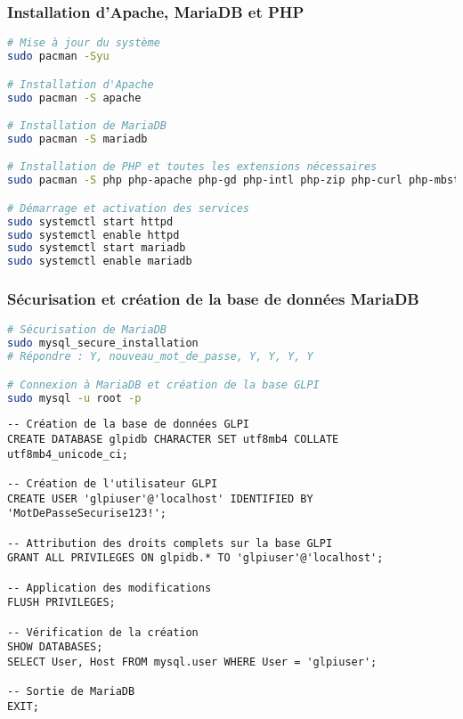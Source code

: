 \documentclass[12pt,a4paper]{article}
\begin{document}
\subsubsection{Installation d'Apache, MariaDB et PHP}
\begin{lstlisting}[language=bash, caption=Installation complète de LAMP sur Arch Linux]
# Mise à jour du système
sudo pacman -Syu

# Installation d'Apache
sudo pacman -S apache

# Installation de MariaDB
sudo pacman -S mariadb

# Installation de PHP et toutes les extensions nécessaires
sudo pacman -S php php-apache php-gd php-intl php-zip php-curl php-mbstring php-xml php-mysql php-ldap php-imap php-snmp

# Démarrage et activation des services
sudo systemctl start httpd
sudo systemctl enable httpd
sudo systemctl start mariadb
sudo systemctl enable mariadb
\end{lstlisting}

\subsubsection{Sécurisation et création de la base de données MariaDB}
\begin{lstlisting}[language=bash, caption=Configuration MariaDB pour GLPI]
# Sécurisation de MariaDB
sudo mysql_secure_installation
# Répondre : Y, nouveau_mot_de_passe, Y, Y, Y, Y

# Connexion à MariaDB et création de la base GLPI
sudo mysql -u root -p
\end{lstlisting}

\begin{lstlisting}[caption=Commandes SQL pour GLPI]
-- Création de la base de données GLPI
CREATE DATABASE glpidb CHARACTER SET utf8mb4 COLLATE utf8mb4_unicode_ci;

-- Création de l'utilisateur GLPI
CREATE USER 'glpiuser'@'localhost' IDENTIFIED BY 'MotDePasseSecurise123!';

-- Attribution des droits complets sur la base GLPI
GRANT ALL PRIVILEGES ON glpidb.* TO 'glpiuser'@'localhost';

-- Application des modifications
FLUSH PRIVILEGES;

-- Vérification de la création
SHOW DATABASES;
SELECT User, Host FROM mysql.user WHERE User = 'glpiuser';

-- Sortie de MariaDB
EXIT;
\end{lstlisting}
\end{document}
